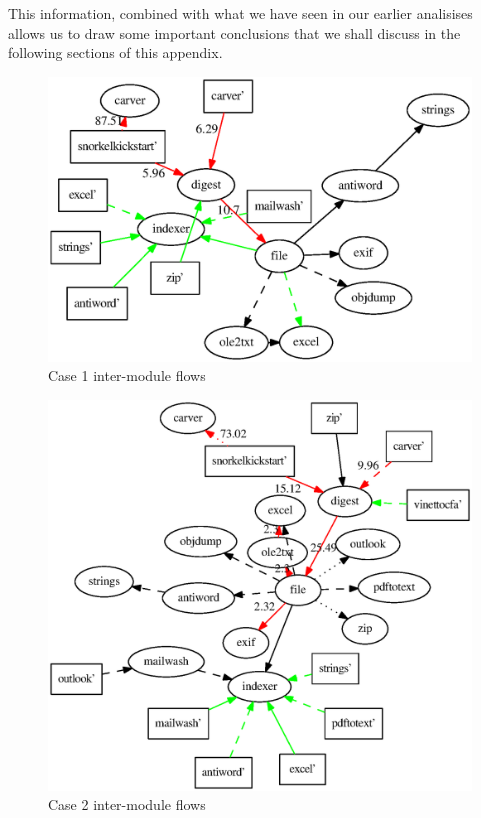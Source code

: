 This information, combined with what we have seen in our earlier analisises allows us to draw some important conclusions that we shall discuss in the following sections of this appendix.
\begin{figure}
  \centering
  \includegraphics[width=130mm]{ocfa/step5/stripped1_modules.eps}
  \caption{Case 1 inter-module flows}
  \label{fig:Case1Modules}
\end{figure}
\begin{figure}
  \centering
  \includegraphics[width=130mm]{ocfa/step5/stripped2_modules.eps}
  \caption{Case 2 inter-module flows}
  \label{fig:Case2Modules}
\end{figure}
